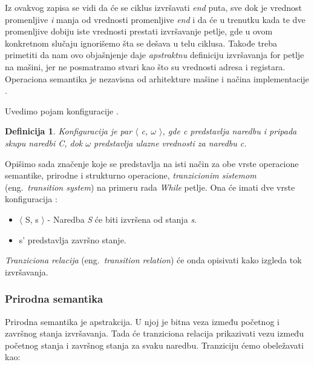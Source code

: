 \documentclass[a4paper]{article}
\newtheorem{definicija}{Definicija}[section]
\begin{document}
{Iz ovakvog zapisa se vidi da će se ciklus izvršavati \textit{end} puta, sve dok je vrednost promenljive \textit{i} manja od vrednosti promenljive \textit{end} i da će u trenutku kada te dve promenljive dobiju iste vrednosti prestati izvršavanje petlje, gde u ovom konkretnom slučaju ignorišemo šta se dešava u telu ciklusa. Takođe treba primetiti da nam ovo objašnjenje daje \textit{apstraktnu} definiciju izvršavanja for petlje na mašini, jer ne posmatramo stvari kao što su vrednosti adresa i registara. Operaciona semantika je nezavisna od arhitekture mašine i načina implementacije \cite{parezanovic}.


Uvedimo pojam konfiguracije \cite{opersem2}.
\begin{definicija}
Konfiguracija je par $\langle$ \textit{c, $\omega$} $\rangle$, gde \textit{c} predstavlja naredbu i pripada skupu naredbi \textit{C}, dok $\omega$ predstavlja ulazne vrednosti za naredbu \textit{c}.
\end{definicija}
Opišimo sada značenje koje se predstavlja na isti način za obe vrste operacione semantike, prirodne i strukturno operacione, \textit{tranzicionim sistemom} (eng.~{\em transition system}) na primeru rada \emph{While} petlje. Ona će imati dve vrste konfiguracija \cite{wiley}:
\begin{itemize}
	\item $\langle$ S, s $\rangle$ - Naredba \textit{S} će biti izvršena od stanja \textit{s}.
	\item s' predstavlja završno stanje.
\end{itemize}
\textit{Tranziciona relacija} (eng.~{\em transition relation}) će onda opisivati kako izgleda tok izvršavanja. \\
 
\subsubsection{Prirodna semantika}

\qquad Prirodna semantika je apstrakcija. U njoj je bitna veza između početnog i završnog stanja izvršavanja. Tada će tranziciona relacija prikazivati vezu između početnog stanja i završnog stanja za svaku naredbu. Tranziciju ćemo obeležavati kao:

}
\end{document}
